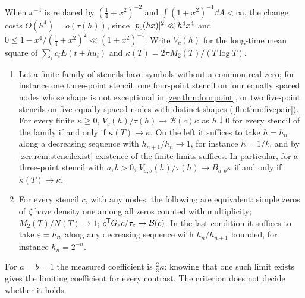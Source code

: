 When $x^{-4}$ is replaced by $(\tfrac14+x^2)^{-2}$ and $\int(1+x^2)^{-1}\dd A<\infty$, the change costs
$O(h^4)=o(\tau(h))$, since $\lvert p_c(hx)\rvert^2\ll h^4x^4$ and $0\le1-x^4/(\tfrac14+x^2)^2\ll(1+x^2)^{-1}$. Write
$V_c(h)$ for the long-time mean square of $\sum_ic_iE(t+hu_i)$ and $\kappa(T)=2\pi M_2(T)/(T\log T)$.

\begin{theorem}\label{zer:thm:coalesceinverse}
\begin{enumerate}[label=\textup{(\roman*)}]
\item Let a finite family of stencils have symbols without a common real zero; for instance one
three-point stencil, one four-point stencil on four equally spaced nodes whose shape is not
exceptional in
\cref{zer:thm:fourpoint}, or two five-point stencils on five equally spaced nodes with distinct shapes
(\cref{flu:thm:fivepair}). For every finite $\kappa\ge0$, $V_c(h)/\tau(h)\to\mathcal B(c)\kappa$ as $h\downarrow0$
for every stencil of the family if and only if $\kappa(T)\to\kappa$. On the left it suffices to take
$h=h_n$ along a decreasing sequence with $h_{n+1}/h_n\to1$, for instance $h=1/k$, and by
\cref{zer:rem:stencilexist} existence of the finite limits suffices. In particular, for a three-point
stencil with $a,b>0$, $V_{a,b}(h)/\tau(h)\to B_{a,b}\kappa$ if and only if $\kappa(T)\to\kappa$.
\item For every stencil $c$, with any nodes, the following are equivalent: simple zeros of
$\zeta$ have density one among all zeros counted with multiplicity; $M_2(T)/N(T)\to1$;
$c^{\mathsf T}G_\varepsilon c/\tau_\varepsilon\to\mathcal B(c)$. In the last condition it suffices to take $\varepsilon=h_n$ along
any decreasing sequence with $h_n/h_{n+1}$ bounded, for instance $h_n=2^{-n}$.
\end{enumerate}
\end{theorem}

For $a=b=1$ the measured coefficient is $\tfrac23\kappa$: knowing that one such limit exists gives the
limiting coefficient for every contrast. The criterion does not decide whether it holds.

